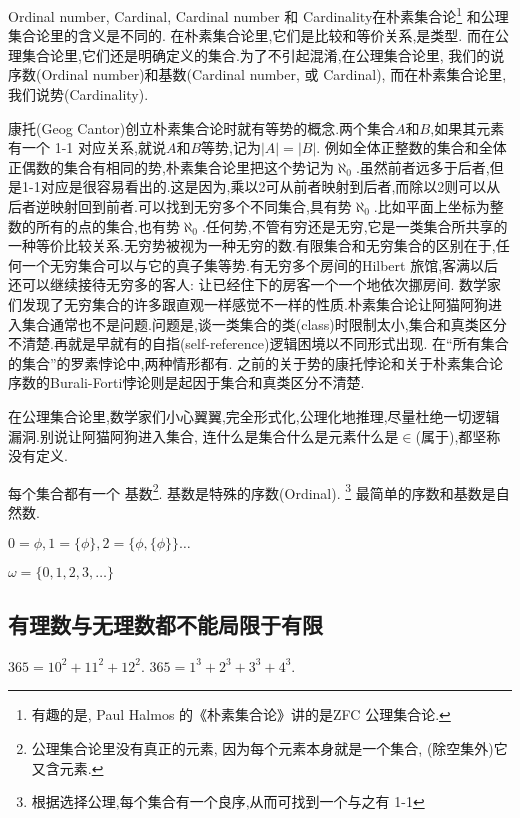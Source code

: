 \documentclass[main.tex]{subfiles}
\begin{document}
Ordinal number, Cardinal, Cardinal number 和 Cardinality在朴素集合论\footnote{有趣的是, Paul Halmos 的《朴素集合论》\cite{HalmosP}讲的是ZFC 公理集合论.}
和公理集合论里的含义是不同的. 
在朴素集合论里,它们是比较和等价关系,是类型.
而在公理集合论里,它们还是明确定义的集合.为了不引起混淆,在公理集合论里,
我们的说序数(Ordinal number)和基数(Cardinal number, 或 Cardinal),
而在朴素集合论里,我们说势(Cardinality).

康托(Geog Cantor)创立朴素集合论时就有等势的概念.两个集合$A$和$B$,如果其元素有一个 1-1 对应关系,就说$A$和$B$等势,记为$|A|=|B|$.
例如全体正整数的集合和全体正偶数的集合有相同的势,朴素集合论里把这个势记为$\aleph_0$.虽然前者远多于后者,但是1-1对应是很容易看出的.这是因为,乘以2可从前者映射到后者,而除以2则可以从后者逆映射回到前者.可以找到无穷多个不同集合,具有势$\aleph_0$.比如平面上坐标为整数的所有的点的集合,也有势$\aleph_0$.任何势,不管有穷还是无穷,它是一类集合所共享的一种等价比较关系.无穷势被视为一种无穷的数.有限集合和无穷集合的区别在于,任何一个无穷集合可以与它的真子集等势.有无穷多个房间的Hilbert 旅馆,客满以后还可以继续接待无穷多的客人: 让已经住下的房客一个一个地依次挪房间.
数学家们发现了无穷集合的许多跟直观一样感觉不一样的性质.朴素集合论让阿猫阿狗进入集合通常也不是问题.问题是,谈一类集合的类(class)时限制太小,集合和真类区分不清楚.再就是早就有的自指(self-reference)逻辑困境以不同形式出现.
在“所有集合的集合”的罗素悖论中,两种情形都有.
之前的关于势的康托悖论和关于朴素集合论序数的Burali-Forti悖论则是起因于集合和真类区分不清楚.

在公理集合论里,数学家们小心翼翼,完全形式化,公理化地推理,尽量杜绝一切逻辑漏洞.别说让阿猫阿狗进入集合, 连什么是集合什么是元素什么是$\in$(属于),都坚称没有定义.

每个集合都有一个
基数\footnote{公理集合论里没有真正的元素,
	因为每个元素本身就是一个集合, (除空集外)它又含元素.}. 
基数是特殊的序数(Ordinal).
\footnote{根据选择公理,每个集合有一个良序,从而可找到一个与之有 1-1 }
最简单的序数和基数是自然数.



$0 = \phi, 1 = \{\phi\}, 2 = \{\phi, \{\phi\}\}\dots$

$\omega = \{0, 1, 2, 3, \dots\}$
\subsection{有理数与无理数都不能局限于有限}

$365=10^2+11^2+12^2$.
$365=1^3+2^3+3^3+4^3$.
\end{document}
